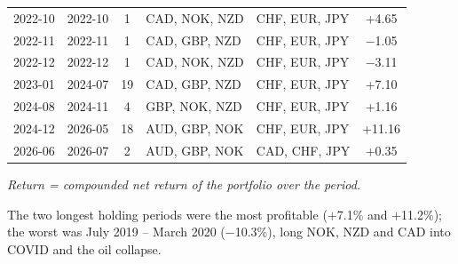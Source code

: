 \documentclass[11pt,a4paper]{article}
\begin{document}
{\begin{longtable}{llcp{3.6cm}p{3.6cm}c}
2022-10 & 2022-10 & 1 & CAD, NOK, NZD & CHF, EUR, JPY & +4.65 \\
2022-11 & 2022-11 & 1 & CAD, GBP, NZD & CHF, EUR, JPY & $-$1.05 \\
2022-12 & 2022-12 & 1 & CAD, NOK, NZD & CHF, EUR, JPY & $-$3.11 \\
2023-01 & 2024-07 & 19 & CAD, GBP, NZD & CHF, EUR, JPY & +7.10 \\
2024-08 & 2024-11 & 4 & GBP, NOK, NZD & CHF, EUR, JPY & +1.16 \\
2024-12 & 2026-05 & 18 & AUD, GBP, NOK & CHF, EUR, JPY & +11.16 \\
2026-06 & 2026-07 & 2 & AUD, GBP, NOK & CAD, CHF, JPY & +0.35 \\
\end{longtable}
\vspace{-0.6em}\par\footnotesize\emph{Return = compounded net return of the portfolio over the period.}\par
}

The two longest holding periods were the most profitable ($+$7.1\% and $+$11.2\%); the worst was
July 2019 -- March 2020 ($-$10.3\%), long NOK, NZD and CAD into COVID and the oil collapse.
\end{document}
